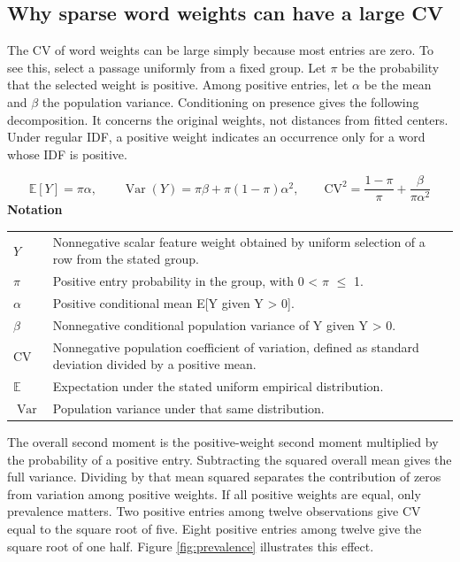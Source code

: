 \documentclass[10pt,letterpaper]{article}
\newcommand{\notlabel}{\noindent\textbf{Notation}\par\nobreak\vspace{4pt}}
\begin{document}
\subsection{Why sparse word weights can have a large CV}
The CV of word weights can be large simply because most entries are zero. To see this, select a passage uniformly from a fixed group. Let \ensuremath{\pi} be the probability that the selected weight is positive. Among positive entries, let \ensuremath{\alpha} be the mean and \ensuremath{\beta} the population variance. Conditioning on presence gives the following decomposition. It concerns the original weights, not distances from fitted centers. Under regular IDF, a positive weight indicates an occurrence only for a word whose IDF is positive.\par

\par\noindent\begin{minipage}{\linewidth}
\begin{equation}\label{eq:mixture}
\mathbb E[Y]=\pi\alpha,\qquad\operatorname{Var}(Y)=\pi\beta+\pi(1-\pi)\alpha^2,\qquad\mathrm{CV}^2=\frac{1-\pi}{\pi}+\frac{\beta}{\pi\alpha^2}
\end{equation}
\notlabel
{\fontsize{8.5}{10.5}\selectfont\setlength{\tabcolsep}{0pt}\renewcommand{\arraystretch}{1.12}
\begin{tabularx}{\linewidth}{@{}p{.14\linewidth}X@{}}
$Y$ & Nonnegative scalar feature weight obtained by uniform selection of a row from the stated group.\\
$\pi$ & Positive entry probability in the group, with 0 < \ensuremath{\pi} \ensuremath{\leq} 1.\\
$\alpha$ & Positive conditional mean E[Y given Y > 0].\\
$\beta$ & Nonnegative conditional population variance of Y given Y > 0.\\
$\mathrm{CV}$ & Nonnegative population coefficient of variation, defined as standard deviation divided by a positive mean.\\
$\mathbb E$ & Expectation under the stated uniform empirical distribution.\\
$\operatorname{Var}$ & Population variance under that same distribution.\\
\end{tabularx}}
\par\vspace{2pt}
\end{minipage}\par
The overall second moment is the positive-weight second moment multiplied by the probability of a positive entry. Subtracting the squared overall mean gives the full variance. Dividing by that mean squared separates the contribution of zeros from variation among positive weights. If all positive weights are equal, only prevalence matters. Two positive entries among twelve observations give CV equal to the square root of five. Eight positive entries among twelve give the square root of one half. Figure \ref{fig:prevalence} illustrates this effect.\par
\end{document}
